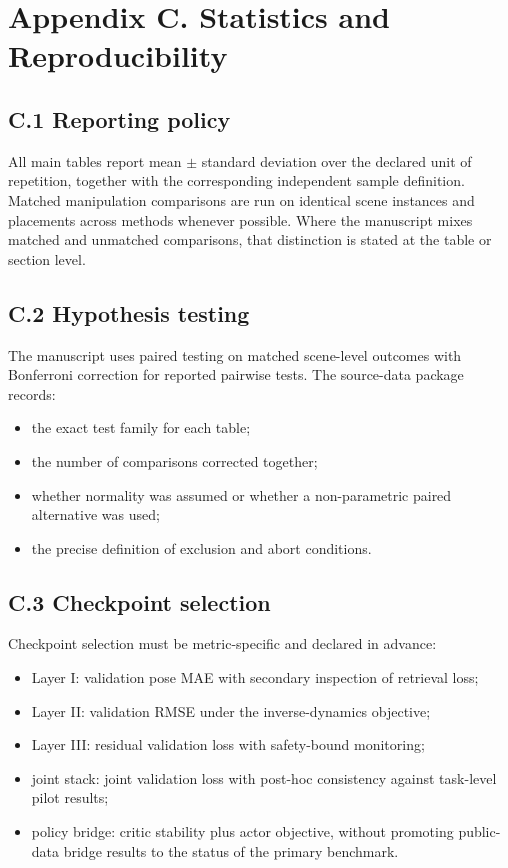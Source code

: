 \documentclass[11pt]{article}
\begin{document}
\section{Appendix C. Statistics and Reproducibility}

\subsection{C.1 Reporting policy}

All main tables report mean $\pm$ standard deviation over the declared unit of repetition, together with the corresponding independent sample definition. Matched manipulation comparisons are run on identical scene instances and placements across methods whenever possible. Where the manuscript mixes matched and unmatched comparisons, that distinction is stated at the table or section level.

\subsection{C.2 Hypothesis testing}

The manuscript uses paired testing on matched scene-level outcomes with Bonferroni correction for reported pairwise tests. The source-data package records:

\begin{itemize}[leftmargin=1.5em]
\item the exact test family for each table;
\item the number of comparisons corrected together;
\item whether normality was assumed or whether a non-parametric paired alternative was used;
\item the precise definition of exclusion and abort conditions.
\end{itemize}

\subsection{C.3 Checkpoint selection}

Checkpoint selection must be metric-specific and declared in advance:

\begin{itemize}[leftmargin=1.5em]
\item Layer I: validation pose MAE with secondary inspection of retrieval loss;
\item Layer II: validation RMSE under the inverse-dynamics objective;
\item Layer III: residual validation loss with safety-bound monitoring;
\item joint stack: joint validation loss with post-hoc consistency against task-level pilot results;
\item policy bridge: critic stability plus actor objective, without promoting public-data bridge results to the status of the primary benchmark.
\end{itemize}
\end{document}
